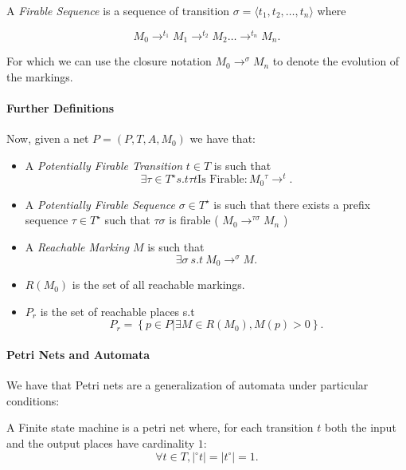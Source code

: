 \documentclass[openright, twoside, twocolumn]{report}
\begin{document}
    A \emph{Firable Sequence} is a sequence of transition $\sigma = \langle t_1, t_2, \ldots, t_n \rangle$ where 

    \[
      M_0 \to^{ t_1} M_1 \to^{ t_2} M_2 \ldots \to^{ t_n} M_n
    .\]

    For which we can use the closure notation $ M_0 \to^{\sigma} M_n$ to denote the evolution of the markings.
    
  \paragraph{Further Definitions} 

    Now, given a net $P = (P, T, A, M_0)$ we have that: 
    \begin{itemize}
      \item A \emph{Potentially Firable Transition}  $t \in T$  is such that 
      \[
        \exists \tau \in T^{\star} s.t \tau t \text{Is Firable}: M_0 {}^{\tau}\to^{t} 
      .\]
      \item A \emph{Potentially Firable Sequence} $\sigma \in T^{\star}$ is such that 
      there exists a prefix sequence $\tau \in T^{\star}$ such that $\tau \sigma$ is firable (
        $M_0 \to^{\tau \sigma} M_n$
        )
      \item A \emph{Reachable Marking} $M$ is such that 
      \[
         \exists \sigma\ s.t\ M_0 \to^{\sigma} M
      .\]
      \item $R( M_0)$ is the set of all reachable markings.  
      \item $P_r$ is the set of reachable places s.t 
      \[
        P_r = \left\{ p \in  P | \exists  M \in  R( M_0), M(p) > 0 \right\} 
      .\]
    \end{itemize}

    \paragraph{Petri Nets and Automata}
    
    We have that Petri nets are a generalization of automata under particular conditions:

    \begin{definition}
      A Finite state machine is a petri net where, for each transition $t$ both 
      the input and the output places have cardinality $1$: 
      \[
        \forall  t \in  T, |{}^{\circ}t| = |t^{\circ}| = 1
      .\]
    \end{definition}
    
\end{document}
